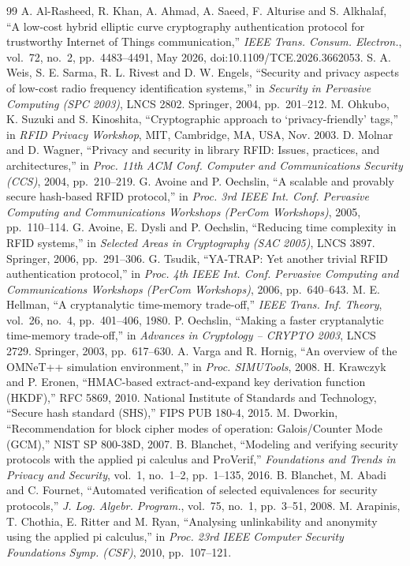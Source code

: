 \balance
\begin{thebibliography}{99}
 A. Al-Rasheed, R. Khan, A. Ahmad, A. Saeed, F. Alturise and S. Alkhalaf, ``A low-cost hybrid elliptic curve cryptography authentication protocol for trustworthy Internet of Things communication,'' \emph{IEEE Trans. Consum. Electron.}, vol.~72, no.~2, pp.~4483--4491, May 2026, doi:10.1109/TCE.2026.3662053.
 S. A. Weis, S. E. Sarma, R. L. Rivest and D. W. Engels, ``Security and privacy aspects of low-cost radio frequency identification systems,'' in \emph{Security in Pervasive Computing (SPC 2003)}, LNCS 2802. Springer, 2004, pp.~201--212.
 M. Ohkubo, K. Suzuki and S. Kinoshita, ``Cryptographic approach to `privacy-friendly' tags,'' in \emph{RFID Privacy Workshop}, MIT, Cambridge, MA, USA, Nov. 2003.
 D. Molnar and D. Wagner, ``Privacy and security in library RFID: Issues, practices, and architectures,'' in \emph{Proc. 11th ACM Conf. Computer and Communications Security (CCS)}, 2004, pp.~210--219.
 G. Avoine and P. Oechslin, ``A scalable and provably secure hash-based RFID protocol,'' in \emph{Proc. 3rd IEEE Int. Conf. Pervasive Computing and Communications Workshops (PerCom Workshops)}, 2005, pp.~110--114.
 G. Avoine, E. Dysli and P. Oechslin, ``Reducing time complexity in RFID systems,'' in \emph{Selected Areas in Cryptography (SAC 2005)}, LNCS 3897. Springer, 2006, pp.~291--306.
 G. Tsudik, ``YA-TRAP: Yet another trivial RFID authentication protocol,'' in \emph{Proc. 4th IEEE Int. Conf. Pervasive Computing and Communications Workshops (PerCom Workshops)}, 2006, pp.~640--643.
 M. E. Hellman, ``A cryptanalytic time-memory trade-off,'' \emph{IEEE Trans. Inf. Theory}, vol.~26, no.~4, pp.~401--406, 1980.
 P. Oechslin, ``Making a faster cryptanalytic time-memory trade-off,'' in \emph{Advances in Cryptology -- CRYPTO 2003}, LNCS 2729. Springer, 2003, pp.~617--630.
 A. Varga and R. Hornig, ``An overview of the OMNeT++ simulation environment,'' in \emph{Proc. SIMUTools}, 2008.
 H. Krawczyk and P. Eronen, ``HMAC-based extract-and-expand key derivation function (HKDF),'' RFC 5869, 2010.
 National Institute of Standards and Technology, ``Secure hash standard (SHS),'' FIPS PUB 180-4, 2015.
 M. Dworkin, ``Recommendation for block cipher modes of operation: Galois/Counter Mode (GCM),'' NIST SP 800-38D, 2007.
\iffv
{} B. Blanchet, ``Modeling and verifying security protocols with the applied pi calculus and ProVerif,'' \emph{Foundations and Trends in Privacy and Security}, vol.~1, no.~1--2, pp.~1--135, 2016.
 B. Blanchet, M. Abadi and C. Fournet, ``Automated verification of selected equivalences for security protocols,'' \emph{J. Log. Algebr. Program.}, vol.~75, no.~1, pp.~3--51, 2008.
 M. Arapinis, T. Chothia, E. Ritter and M. Ryan, ``Analysing unlinkability and anonymity using the applied pi calculus,'' in \emph{Proc. 23rd IEEE Computer Security Foundations Symp. (CSF)}, 2010, pp.~107--121.
\fi
\end{thebibliography}
